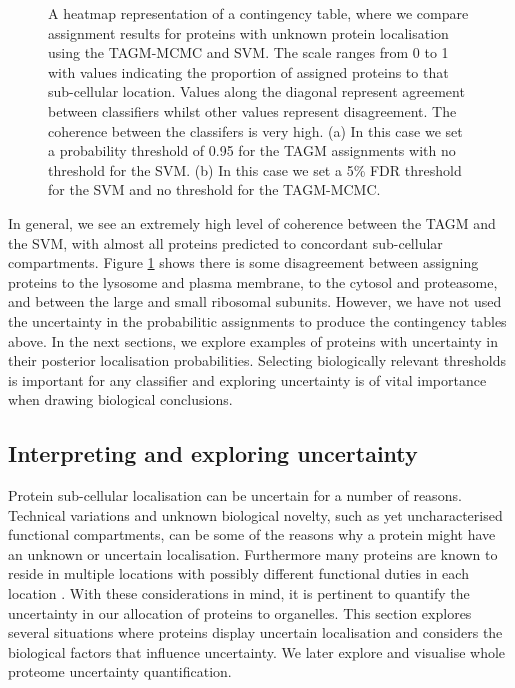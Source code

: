 \documentclass[12pt,english]{article}\usepackage[]{graphicx}\usepackage[]{color}
\newenvironment{knitrout}{}{} %
\begin{document}
\begin{figure}[ht]
\begin{subfigure}[t]{0.5\textwidth}
\begin{knitrout}
\end{knitrout}
\end{subfigure}
\caption{A heatmap representation of a contingency table, where we
  compare assignment results for proteins with unknown protein
  localisation using the TAGM-MCMC and SVM. The scale ranges from 0 to
  1 with values indicating the proportion of assigned proteins to that
  sub-cellular location. Values along the diagonal represent agreement
  between classifiers whilst other values represent disagreement. The
  coherence between the classifers is very high.  (a) In this case we
  set a probability threshold of 0.95 for the TAGM assignments with no
  threshold for the SVM.  (b) In this case we set a 5\% FDR threshold
  for the SVM and no threshold for the TAGM-MCMC.}
\label{figure:contigencytables}
\end{figure}

In general, we see an extremely high level of coherence between the
TAGM and the SVM, with almost all proteins predicted to concordant
sub-cellular compartments. Figure \ref{figure:contigencytables} shows
there is some disagreement between assigning proteins to the lysosome
and plasma membrane, to the cytosol and proteasome, and between the
large and small ribosomal subunits.  However, we have not used the
uncertainty in the probabilitic assignments to produce the contingency
tables above. In the next sections, we explore examples of proteins
with uncertainty in their posterior localisation
probabilities. Selecting biologically relevant thresholds is important
for any classifier and exploring uncertainty is of vital importance
when drawing biological conclusions.


\subsection*{Interpreting and exploring uncertainty}

Protein sub-cellular localisation can be uncertain for a number of
reasons. Technical variations and unknown biological novelty, such as
yet uncharacterised functional compartments, can be some of the
reasons why a protein might have an unknown or uncertain
localisation. Furthermore many proteins are known to reside in
multiple locations with possibly different functional duties in each
location \citep{Jeffery:2009}. With these considerations in mind, it is pertinent to
quantify the uncertainty in our allocation of proteins to organelles.
This section explores several situations where proteins display
uncertain localisation and considers the biological factors that
influence uncertainty.  We later explore and visualise whole proteome
uncertainty quantification.
\end{document}

